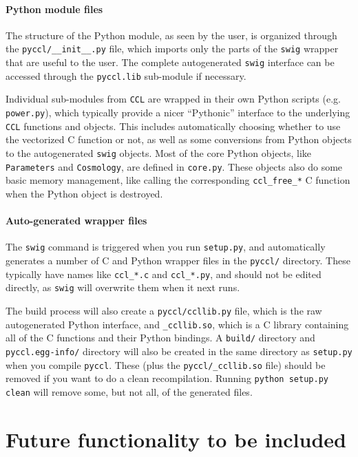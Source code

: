 \documentclass[\docopts]{\docclass}
\begin{document}
\paragraph{Python module files} The structure of the Python module, as seen by the user, is organized through the {\tt pyccl/\_\_init\_\_.py} file, which imports only the parts of the {\tt swig} wrapper that are useful to the user. The complete autogenerated {\tt swig} interface can be accessed through the {\tt pyccl.lib} sub-module if necessary.

Individual sub-modules from {\tt CCL} are wrapped in their own Python scripts (e.g. {\tt power.py}), which typically provide a nicer ``Pythonic'' interface to the underlying {\tt CCL} functions and objects. This includes automatically choosing whether to use the vectorized C function or not, as well as some conversions from Python objects to the autogenerated {\tt swig} objects. Most of the core Python objects, like {\tt Parameters} and {\tt Cosmology}, are defined in {\tt core.py}. These objects also do some basic memory management, like calling the corresponding {\tt ccl\_free\_*} C function when the Python object is destroyed.

\paragraph{Auto-generated wrapper files} The {\tt swig} command is triggered when you run {\tt setup.py}, and automatically generates a number of C and Python wrapper files in the {\tt pyccl/} directory. These typically have names like {\tt ccl\_*.c} and {\tt ccl\_*.py}, and should not be edited directly, as {\tt swig} will overwrite them when it next runs.

The build process will also create a {\tt pyccl/ccllib.py} file, which is the raw autogenerated Python interface, and {\tt \_ccllib.so}, which is a C library containing all of the C functions and their Python bindings. A {\tt build/} directory and {\tt pyccl.egg-info/} directory will also be created in the same directory as {\tt setup.py} when you compile {\tt pyccl}. These (plus the {\tt pyccl/\_ccllib.so} file) should be removed if you want to do a clean recompilation. Running {\tt python setup.py clean} will remove some, but not all, of the generated files.

\section{Future functionality to be included}
\label{sec:future}
\end{document}
